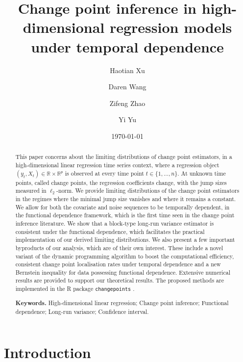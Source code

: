 \documentclass[11pt]{article}
\title{Change point inference in high-dimensional regression models under temporal dependence}
\author[1]{Haotian Xu}
\author[2]{Daren Wang}
\author[3]{Zifeng Zhao}
\author[1]{Yi Yu}
\affil[1]{Department of Statistics, University of Warwick}
\affil[2]{Department of Statistics, University of Notre Dame}
\affil[3]{Mendoza College of Business, University of Notre Dame}
\date{\today}
\theoremstyle{plain}
\theoremstyle{definition}
\begin{document}
\maketitle

\begin{abstract}
    This paper concerns about the limiting distributions of change point estimators, in a high-dimensional linear regression time series context, where a regression object $(y_t, X_t) \in \mathbb{R} \times \mathbb{R}^p$ is observed at every time point $t \in \{1, \ldots, n\}$. At unknown time points, called change points, the regression coefficients change, with the jump sizes measured in $\ell_2$-norm. We provide limiting distributions of the change point estimators in the regimes where the minimal jump size vanishes and where it remains a constant. We allow for both the covariate and noise sequences to be temporally dependent, in the functional dependence framework, which is the first time seen in the change point inference literature.  We show that a block-type long-run variance estimator is consistent under the functional dependence, which facilitates the practical implementation of our derived limiting distributions. We also present a few important byproducts of our analysis, which are of their own interest. These include a novel variant of the dynamic programming algorithm to boost the computational efficiency, consistent change point localisation rates under temporal dependence and a new Bernstein inequality for data possessing functional dependence.  Extensive numerical results are provided to support our theoretical results.  The proposed methods are implemented in the R package \texttt{changepoints} \citep{changepoints_R}.

\vskip 0.3cm
{\bf Keywords.} High-dimensional linear regression; Change point inference; Functional dependence; Long-run variance; Confidence interval.

\end{abstract}


\section{Introduction}\label{sec:intro}
\end{document}
